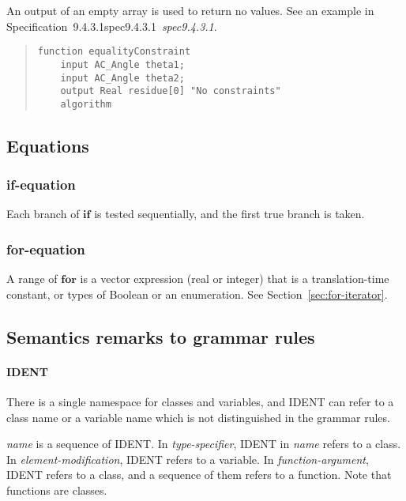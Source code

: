 \documentclass[10pt,b5paper]{article}
\def\specrefx#1#2{Specification~#1\ifx\relax#2\relax{}\else~{\it{}#2}\fi}
\def\specref#1{\specrefx{#1}{\csname spec#1\endcsname}}
\begin{document}
An output of an empty array is used to return no values.  See an
example in \specref{9.4.3.1}.

\begin{quote}
\begin{lstlisting}[aboveskip=-\baselineskip]
function equalityConstraint
    input AC_Angle theta1;
    input AC_Angle theta2;
    output Real residue[0] "No constraints"
    algorithm
\end{lstlisting}
\end{quote}


\subsection{Equations}

\subsubsection*{if-equation}

Each branch of $\mathbf{if}$ is tested sequentially, and the first
true branch is taken.

\subsubsection*{for-equation}

A range of $\mathbf{for}$ is a vector expression (real or integer)
that is a translation-time constant, or types of Boolean or an
enumeration.  See Section~\ref{sec:for-iterator}.


\subsection{Semantics remarks to grammar rules}

\paragraph {IDENT}

There is a single namespace for classes and variables, and {IDENT} can
refer to a class name or a variable name which is not distinguished in
the grammar rules.

{\it{}name\/} is a sequence of {IDENT}.  In {\it{}type-specifier},
IDENT in {\it{}name\/} refers to a class.  In
{\it{}element-modification}, IDENT refers to a variable.  In
{\it{}function-argument}, IDENT refers to a class, and a sequence of
them refers to a function.  Note that functions are classes.
\end{document}
